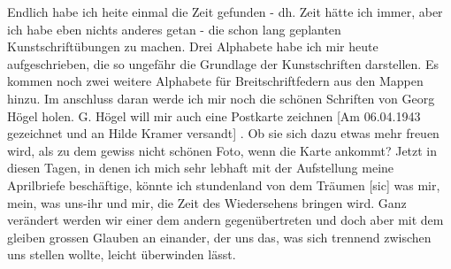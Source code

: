 \def\day{31. M\"{a}rz 1943}
\mktitle

Endlich habe ich heite einmal die Zeit gefunden - dh. Zeit h\"{a}tte ich immer, aber ich habe eben nichts anderes getan - die schon lang geplanten Kunstschrift\"{u}bungen zu machen.
Drei Alphabete habe ich mir heute aufgeschrieben, die so ungef\"{a}hr die Grundlage der Kunstschriften darstellen.
Es kommen noch zwei weitere Alphabete f\"{u}r Breitschriftfedern aus den Mappen hinzu.
Im anschluss daran werde ich mir noch die sch\"{o}nen Schriften von Georg H\"{o}gel holen.
G. H\"{o}gel will mir auch eine Postkarte zeichnen{\color{red} [Am 06.04.1943 gezeichnet und an Hilde Kramer versandt] }.
Ob sie sich dazu etwas mehr freuen wird, als zu dem gewiss nicht sch\"{o}nen Foto, wenn die Karte ankommt?
Jetzt in diesen Tagen, in denen ich mich sehr lebhaft mit der Aufstellung meine Aprilbriefe besch\"{a}ftige, k\"{o}nnte ich stundenland von dem Tr\"{a}umen{\color{red} [sic] } was mir, mein, was uns-ihr und mir, die Zeit des Wiedersehens bringen wird.
Ganz ver\"{a}ndert werden wir einer dem andern gegen\"{u}bertreten und doch aber mit dem gleiben grossen Glauben an einander, der uns das, was sich trennend zwischen uns stellen wollte, leicht \"{u}berwinden l\"{a}sst.

\clearpage
